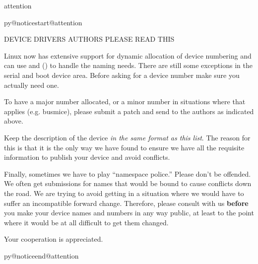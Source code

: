 \documentclass[a4paper,8pt,english]{sphinxmanual}
\makeatletter
\renewenvironment{notice}[2]{%
          \def\py@noticetype{#1}
          \begin{coloredbox}{#1}
          \bf\it
          \par\strong{#2}
          \csname py@noticestart@#1\endcsname
        }
	{
          \csname py@noticeend@\py@noticetype\endcsname
          \end{coloredbox}
        }
\makeatother
\begin{document}
\begin{notice}{attention}{Attention:}
DEVICE DRIVERS AUTHORS PLEASE READ THIS

Linux now has extensive support for dynamic allocation of device numbering
and can use  and  () to handle the naming needs.
There are still some exceptions in the serial and boot device area. Before
asking   for a device number make sure you actually need one.

To have a major number allocated, or a minor number in situations
where that applies (e.g. busmice), please submit a patch and send to
the authors as indicated above.

Keep the description of the device \emph{in the same format
as this list}. The reason for this is that it is the only way we have
found to ensure we have all the requisite information to publish your
device and avoid conflicts.

Finally, sometimes we have to play ``namespace police.''  Please don't be
offended.  We often get submissions for  names that would be bound
to cause conflicts down the road.  We are trying to avoid getting in a
situation where we would have to suffer an incompatible forward
change.  Therefore, please consult with us \textbf{before} you make your
device names and numbers in any way public, at least to the point
where it would be at all difficult to get them changed.

Your cooperation is appreciated.
\end{notice}
\end{document}
